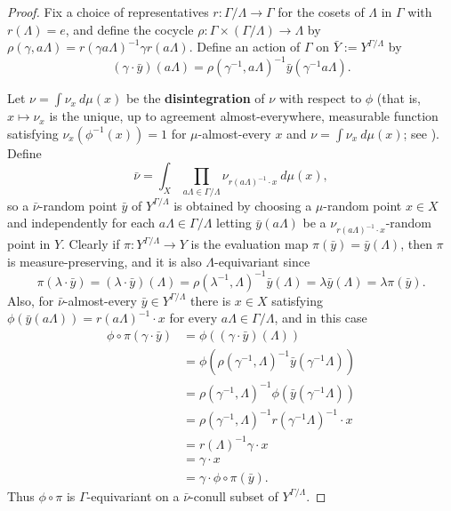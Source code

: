 \documentclass[12pt]{amsart}
\theoremstyle{definition}
\begin{document}
\begin{proof}
	Fix a choice of representatives $r : \Gamma / \Lambda \rightarrow \Gamma$ for the cosets of $\Lambda$ in $\Gamma$ with $r(\Lambda) = e$, and define the cocycle $\rho : \Gamma \times (\Gamma / \Lambda) \rightarrow \Lambda$ by $\rho(\gamma, a \Lambda) = r(\gamma a \Lambda)^{-1} \gamma r(a \Lambda)$. Define an action of $\Gamma$ on $\bar{Y} := Y^{\Gamma/ \Lambda}$ by
	\[(\gamma \cdot \bar{y})(a \Lambda) = \rho(\gamma^{-1}, a \Lambda)^{-1} \bar{y}(\gamma^{-1} a \Lambda).\]
	
	Let $\nu = \int \nu_x \ d \mu(x)$ be the \textbf{disintegration} of $\nu$ with respect to $\phi$ (that is, $x \mapsto \nu_x$ is the unique, up to agreement almost-everywhere, measurable function satisfying $\nu_x(\phi^{-1}(x)) = 1$ for $\mu$-almost-every $x$ and $\nu = \int \nu_x \ d \mu(x)$; see \cite[Theorem A.7]{glasner}). Define
	\[\bar{\nu} = \int_X \prod_{a \Lambda \in \Gamma / \Lambda} \nu_{r(a \Lambda)^{-1} \cdot x} \ d \mu(x),\]
	so a $\bar{\nu}$-random point $\bar{y}$ of $Y^{\Gamma / \Lambda}$ is obtained by choosing a $\mu$-random point $x \in X$ and independently for each $a \Lambda \in \Gamma / \Lambda$ letting $\bar{y}(a \Lambda)$ be a $\nu_{r(a \Lambda)^{-1} \cdot x}$-random point in $Y$. Clearly if $\pi : Y^{\Gamma / \Lambda} \rightarrow Y$ is the evaluation map $\pi(\bar{y}) = \bar{y}(\Lambda)$, then $\pi$ is measure-preserving, and it is also $\Lambda$-equivariant since
	\[\pi(\lambda \cdot \bar{y}) = (\lambda \cdot \bar{y})(\Lambda) = \rho(\lambda^{-1}, \Lambda)^{-1} \bar{y}(\Lambda) = \lambda \bar{y}(\Lambda) = \lambda \pi(\bar{y}).\]
	Also, for $\bar{\nu}$-almost-every $\bar{y} \in Y^{\Gamma / \Lambda}$ there is $x \in X$ satisfying $\phi(\bar{y}(a \Lambda)) = r(a \Lambda)^{-1} \cdot x$ for every $a \Lambda \in \Gamma / \Lambda$, and in this case
	\begin{align*}
	\phi \circ \pi(\gamma \cdot \bar{y}) & = \phi((\gamma \cdot \bar{y})(\Lambda))\\
	& = \phi(\rho(\gamma^{-1}, \Lambda)^{-1} \bar{y}(\gamma^{-1} \Lambda))\\
	& = \rho(\gamma^{-1}, \Lambda)^{-1} \phi(\bar{y}(\gamma^{-1} \Lambda))\\
	& = \rho(\gamma^{-1}, \Lambda)^{-1} r(\gamma^{-1} \Lambda)^{-1} \cdot x\\
	& = r(\Lambda)^{-1} \gamma \cdot x\\
	& = \gamma \cdot x\\
	& = \gamma \cdot \phi \circ \pi(\bar{y}).
	\end{align*}
	Thus $\phi \circ \pi$ is $\Gamma$-equivariant on a $\bar{\nu}$-conull subset of $Y^{\Gamma / \Lambda}$.
	

\end{proof}
\end{document}
